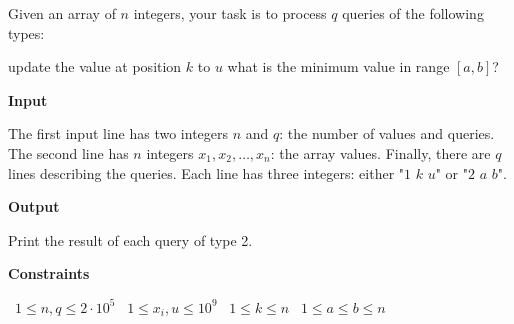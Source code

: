 Given an array of $n$ integers, your task is to process $q$ queries of the following types:

update the value at position $k$ to $u$
what is the minimum value in range $[a,b]$?

\vspace{0.3cm}\noindent\textbf{Input}

The first input line has two integers $n$ and $q$: the number of values and queries.
The second line has $n$ integers $x_1,x_2,\dots,x_n$: the array values.
Finally, there are $q$ lines describing the queries. Each line has three integers: either "$1$ $k$ $u$" or "$2$ $a$ $b$".

\vspace{0.3cm}\noindent\textbf{Output}

Print the result of each query of type 2.

\vspace{0.3cm}\noindent\textbf{Constraints}

\textbullet\ $1 \le n,q \le 2 \cdot 10^5$
\textbullet\ $1 \le x_i, u \le 10^9$
\textbullet\ $1 \le k \le n$
\textbullet\ $1 \le a \le b \le n$